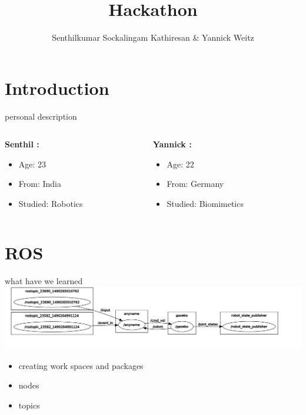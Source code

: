 \documentclass[xcolor=dvipsnames]{beamer}
\title{Hackathon}
\author{Senthilkumar Sockalingam Kathiresan \& Yannick Weitz}
\begin{document}
\begin{frame}
\titlepage
\end{frame}

\begin{frame}
\tableofcontents[section]
\end{frame}

\section{Introduction}


\begin{frame}{personal description}
\begin{columns}

\begin{column}[b]{0.5\textwidth}
\begin{center}
\textbf{Senthil :}

\begin{itemize}
\item Age: 23
\medskip
\item From: India
\medskip
\item Studied: Robotics
\end{itemize}

\end{center}
\end{column}
\begin{column}[b]{0.5\textwidth}  %
\begin{center}
\textbf{Yannick :}

\begin{itemize}
\item Age: 22
\medskip
\item From: Germany
\medskip
\item Studied: Biomimetics
\end{itemize}

\end{center}
\end{column}
\end{columns}

\end{frame}
\section{ROS}

\begin{frame}{what have we learned}
\includegraphics[scale=0.25]{rqtgraph}
\begin{itemize}
\item<1-> creating work spaces and packages
\item<2-> nodes
\item<3-> topics
\end{itemize}
\end{frame}
\end{document}
